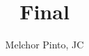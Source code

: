 \documentclass[repaso]{RDS_unit}
\title{Final}
\author{Melchor Pinto, JC}
\begin{document}
    \begin{questions}
	

    \newpage
	

    \newpage
	



\end{questions}
\end{document}
